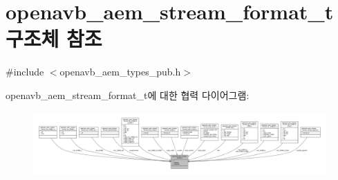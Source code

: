 \hypertarget{structopenavb__aem__stream__format__t}{}\section{openavb\+\_\+aem\+\_\+stream\+\_\+format\+\_\+t 구조체 참조}
\label{structopenavb__aem__stream__format__t}


{\ttfamily \#include $<$openavb\+\_\+aem\+\_\+types\+\_\+pub.\+h$>$}



openavb\+\_\+aem\+\_\+stream\+\_\+format\+\_\+t에 대한 협력 다이어그램\+:
\nopagebreak
\begin{figure}[H]
\begin{center}
\leavevmode
\includegraphics[width=350pt]{structopenavb__aem__stream__format__t__coll__graph}
\end{center}
\end{figure}
